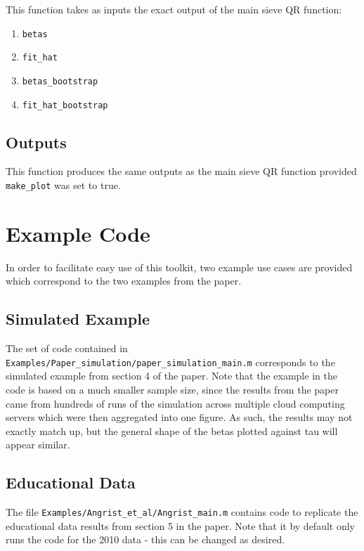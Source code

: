 \documentclass[12pt]{article}
\begin{document}
This function takes as inputs the exact output of the main sieve QR function:

\begin{enumerate}
    \item \lstinline{betas}
    \item \lstinline{fit_hat}
    \item \lstinline{betas_bootstrap}
    \item \lstinline{fit_hat_bootstrap}
\end{enumerate}

\subsection{Outputs}

This function produces the same outputs as the main sieve QR function provided \lstinline{make_plot} was set to true.

\section{Example Code}

In order to facilitate easy use of this toolkit, two example use cases are provided which correspond to the two examples from the paper.

\subsection{Simulated Example}

The set of code contained in \lstinline{Examples/Paper_simulation/paper_simulation_main.m} corresponds to the simulated example from section 4 of the paper. Note that the example in the code is based on a much smaller sample size, since the results from the paper came from hundreds of runs of the simulation across multiple cloud computing servers which were then aggregated into one figure. As such, the results may not exactly match up, but the general shape of the betas plotted against tau will appear similar.

\subsection{Educational Data}

The file \lstinline{Examples/Angrist_et_al/Angrist_main.m} contains code to replicate the educational data results from section 5 in the paper. Note that it by default only runs the code for the 2010 data - this can be changed as desired.
\end{document}
